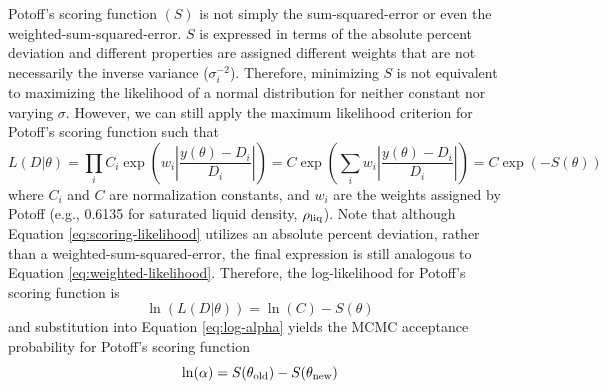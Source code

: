 \documentclass[preprint,review,11pt]{elsarticle}
\begin{document}
	Potoff's scoring function $(S)$ is not simply the sum-squared-error or even the weighted-sum-squared-error. $S$ is expressed in terms of the absolute percent deviation and different properties are assigned different weights that are not necessarily the inverse variance ($\sigma_i^{-2}$). Therefore, minimizing $S$ is not equivalent to maximizing the likelihood of a normal distribution for neither constant nor varying $\sigma$. However, we can still apply the maximum likelihood criterion for Potoff's scoring function such that
	\begin{equation} \label{eq:scoring-likelihood}
	L(D|\theta) = \prod_i C_i \exp\left(w_i\left|\frac{y(\theta)-D_i}{D_i}\right|\right) = C \exp\left(\sum_i w_i\left|\frac{y(\theta)-D_i}{D_i}\right|\right) = C \exp\left(-S(\theta)\right)
	\end{equation}
	where $C_i$ and $C$ are normalization constants, and $w_i$ are the weights assigned by Potoff (e.g., 0.6135 for saturated liquid density, $\rho_{\rm liq}$). Note that although Equation \ref{eq:scoring-likelihood} utilizes an absolute percent deviation, rather than a weighted-sum-squared-error, the final expression is still analogous to Equation \ref{eq:weighted-likelihood}. Therefore, the log-likelihood for Potoff's scoring function is
	\begin{equation}
	\ln(L(D|\theta)) = \ln(C) -S(\theta)
	\end{equation}
	and substitution into Equation \ref{eq:log-alpha} yields the MCMC acceptance probability for Potoff's scoring function
	\begin{equation} \label{eq:log-score}
	\ln(\alpha) = S(\theta_{\rm old}) - S(\theta_{\rm new})
	\end{equation}
	
\end{document}
